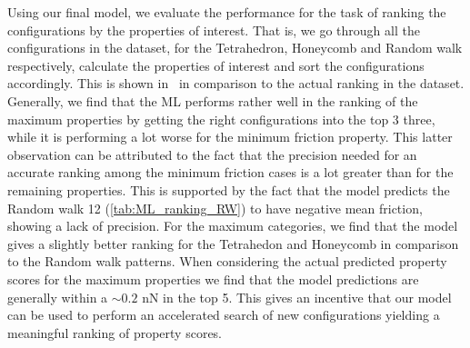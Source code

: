 Using our final model, we evaluate the performance for the task of ranking the
configurations by the properties of interest. That is, we go through all the
configurations in the dataset, for the Tetrahedron, Honeycomb and Random walk
respectively, calculate the properties of interest and sort the configurations
accordingly. This is shown in~
in comparison to the actual ranking in the dataset. Generally, we find that the
\acrshort{ML} performs rather well in the ranking of the maximum properties by
getting the right configurations into the top 3 three, while it is performing a
lot worse for the minimum friction property. This latter observation can be
attributed to the fact that the precision needed for an accurate ranking among
the minimum friction cases is a lot greater than for the remaining properties.
This is supported by the fact that the model predicts the Random walk 12
(\cref{tab:ML_ranking_RW}) to have negative mean friction, showing a lack of
precision. For the maximum categories, we find that the model gives a slightly
better ranking for the Tetrahedon and Honeycomb in comparison to the Random walk
patterns. When considering the actual predicted property scores for the maximum
properties we find that the model predictions are generally within a $\sim 0.2$
nN in the top 5. This gives an incentive that our model can be used to perform
an accelerated search of new configurations yielding a meaningful ranking of
property scores. 


